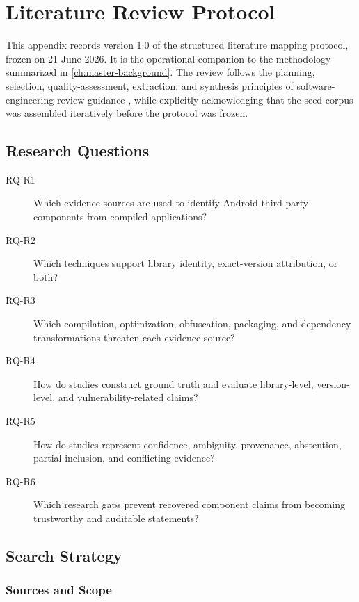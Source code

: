 \chapter{Literature Review Protocol}
\label{app:master-review-protocol}

This appendix records version 1.0 of the structured literature mapping
protocol, frozen on 21 June 2026. It is the operational companion to the
methodology summarized in \cref{ch:master-background}. The review follows the
planning, selection, quality-assessment, extraction, and synthesis principles
of software-engineering review guidance \cite{kitchenham2007guidelines}, while
explicitly acknowledging that the seed corpus was assembled iteratively before
the protocol was frozen.

\section{Research Questions}

\begin{description}
  \item[RQ-R1] Which evidence sources are used to identify Android
    third-party components from compiled applications?
  \item[RQ-R2] Which techniques support library identity, exact-version
    attribution, or both?
  \item[RQ-R3] Which compilation, optimization, obfuscation, packaging, and
    dependency transformations threaten each evidence source?
  \item[RQ-R4] How do studies construct ground truth and evaluate
    library-level, version-level, and vulnerability-related claims?
  \item[RQ-R5] How do studies represent confidence, ambiguity, provenance,
    abstention, partial inclusion, and conflicting evidence?
  \item[RQ-R6] Which research gaps prevent recovered component claims from
    becoming trustworthy and auditable \SBOM statements?
\end{description}

\section{Search Strategy}

\subsection{Sources and Scope}

